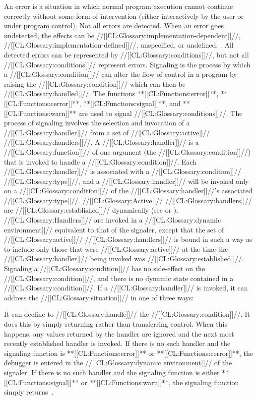 An error is a situation in which normal program execution cannot continue correctly without some form of intervention (either interactively by the user or under program control).  Not all errors are detected.  When an error goes undetected, the effects can be //[[CL:Glossary:implementation-dependent]]//, //[[CL:Glossary:implementation-defined]]//, unspecified, or undefined. \Seesection\Definitions.  All detected errors can be represented by //[[CL:Glossary:conditions]]//, but not all  //[[CL:Glossary:conditions]]// represent errors.
  Signaling is the process by which a //[[CL:Glossary:condition]]// can alter the flow of control in a program by raising the  //[[CL:Glossary:condition]]// which can then be //[[CL:Glossary:handled]]//.  The functions **[[CL:Functions:error]]**, **[[CL:Functions:cerror]]**, **[[CL:Functions:signal]]**, and **[[CL:Functions:warn]]** are used to signal //[[CL:Glossary:conditions]]//.
  The process of signaling involves the selection and invocation of a //[[CL:Glossary:handler]]// from a set of //[[CL:Glossary:active]]// //[[CL:Glossary:handlers]]//.   A //[[CL:Glossary:handler]]// is a //[[CL:Glossary:function]]// of one argument (the  //[[CL:Glossary:condition]]//) that is invoked to handle a //[[CL:Glossary:condition]]//. Each //[[CL:Glossary:handler]]// is associated with a //[[CL:Glossary:condition]]// //[[CL:Glossary:type]]//, and a //[[CL:Glossary:handler]]// will be invoked only on a //[[CL:Glossary:condition]]// of the //[[CL:Glossary:handler]]//'s associated //[[CL:Glossary:type]]//.
  //[[CL:Glossary:Active]]// //[[CL:Glossary:handlers]]// are //[[CL:Glossary:established]]// dynamically (see  or ). //[[CL:Glossary:Handlers]]// are invoked in a //[[CL:Glossary:dynamic environment]]//  equivalent to that of the signaler, except that the set of //[[CL:Glossary:active]]// //[[CL:Glossary:handlers]]//  is bound in such a way as to include only those that were //[[CL:Glossary:active]]//  at the time the //[[CL:Glossary:handler]]// being invoked was //[[CL:Glossary:established]]//. Signaling a //[[CL:Glossary:condition]]// has no side-effect on the //[[CL:Glossary:condition]]//,  and there is no dynamic state contained in a //[[CL:Glossary:condition]]//.
  If a //[[CL:Glossary:handler]]// is invoked, it can address the //[[CL:Glossary:situation]]//  in one of three ways:
  \beginlist {}

It can decline to //[[CL:Glossary:handle]]// the //[[CL:Glossary:condition]]//.  It does this by simply returning rather than transferring control. When this happens, any values returned by the handler are ignored and the next most recently established handler is invoked. If there is no such handler and the signaling function is **[[CL:Functions:error]]** or **[[CL:Functions:cerror]]**, the debugger is entered in the //[[CL:Glossary:dynamic environment]]// of the signaler. If there is no such handler and the signaling function is either **[[CL:Functions:signal]]** or **[[CL:Functions:warn]]**, the signaling function simply returns~\nil.

